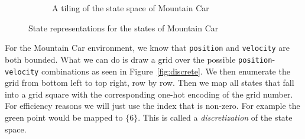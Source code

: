 \documentclass[11pt]{article}
\numberwithin{equation}{section} %
\numberwithin{figure}{section} %
\numberwithin{table}{section} %
\begin{document}
\begin{figure}[H]
\begin{subfigure}{0.5\textwidth}
\caption{A tiling of the state space of Mountain Car}
\label{fig:tiling}
\end{subfigure}

\caption{State representations for the states of Mountain Car}
\label{fig:states}
\end{figure}

For the Mountain Car environment, we know that \texttt{position} and \texttt{velocity} are both bounded. What we can do is draw a grid over the possible \texttt{position}-\texttt{velocity} combinations as seen in Figure~\ref{fig:discrete}. We then enumerate the grid from bottom left to top right, row by row. Then we map all states that fall into a grid square with the corresponding one-hot encoding of the grid number. For efficiency reasons we will just use the index that is non-zero. For example the green point would be mapped to $\{6\}$. This is called a \emph{discretization} of the state space.
\end{document}

